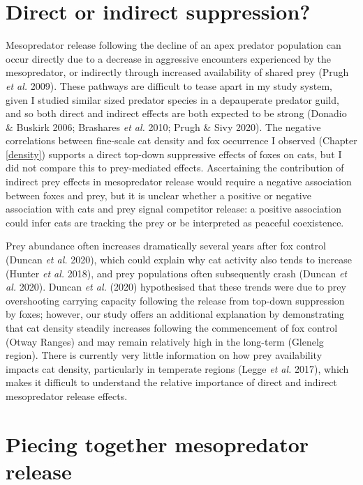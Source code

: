 \documentclass[11pt,a4paper,titlepage,twoside,openright]{style/unimelbthesis}
\begin{document}
\begin{mainmatter}
\hypertarget{direct-or-indirect-suppression}{%
\section{Direct or indirect suppression?}\label{direct-or-indirect-suppression}}

Mesopredator release following the decline of an apex predator population can occur directly due to a decrease in aggressive encounters experienced by the mesopredator, or indirectly through increased availability of shared prey (Prugh \emph{et al.} 2009). These pathways are difficult to tease apart in my study system, given I studied similar sized predator species in a depauperate predator guild, and so both direct and indirect effects are both expected to be strong (Donadio \& Buskirk 2006; Brashares \emph{et al.} 2010; Prugh \& Sivy 2020). The negative correlations between fine-scale cat density and fox occurrence I observed (Chapter \ref{density}) supports a direct top-down suppressive effects of foxes on cats, but I did not compare this to prey-mediated effects. Ascertaining the contribution of indirect prey effects in mesopredator release would require a negative association between foxes and prey, but it is unclear whether a positive or negative association with cats and prey signal competitor release: a positive association could infer cats are tracking the prey or be interpreted as peaceful coexistence.

Prey abundance often increases dramatically several years after fox control (Duncan \emph{et al.} 2020), which could explain why cat activity also tends to increase (Hunter \emph{et al.} 2018), and prey populations often subsequently crash (Duncan \emph{et al.} 2020). Duncan \emph{et al.} (2020) hypothesised that these trends were due to prey overshooting carrying capacity following the release from top-down suppression by foxes; however, our study offers an additional explanation by demonstrating that cat density steadily increases following the commencement of fox control (Otway Ranges) and may remain relatively high in the long-term (Glenelg region). There is currently very little information on how prey availability impacts cat density, particularly in temperate regions (Legge \emph{et al.} 2017), which makes it difficult to understand the relative importance of direct and indirect mesopredator release effects.

\hypertarget{piecing-together-mesopredator-release}{%
\section{Piecing together mesopredator release}\label{piecing-together-mesopredator-release}}


\end{mainmatter}
\end{document}
